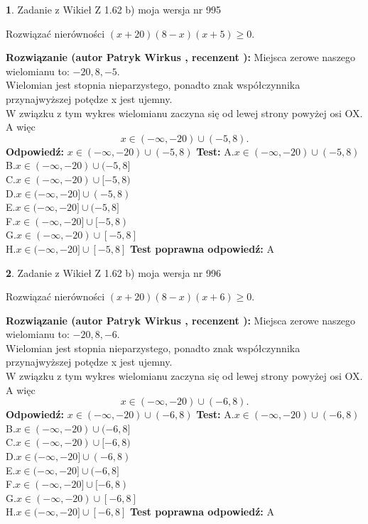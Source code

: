 \documentclass[12pt, a4paper]{article}
\theoremstyle{definition} %
\newtheorem{zad}{}
\newcommand{\zadStart}[1]{\begin{zad}#1\newline}
\newcommand{\zadStop}{\end{zad}}
\newcommand{\rozwStart}[2]{\noindent \textbf{Rozwiązanie (autor #1 , recenzent #2): }\newline}
\newcommand{\rozwStop}{\newline}
\newcommand{\odpStart}{\noindent \textbf{Odpowiedź:}\newline}
\newcommand{\odpStop}{\newline}
\newcommand{\testStart}{\noindent \textbf{Test:}\newline}
\newcommand{\testStop}{\newline}
\newcommand{\kluczStart}{\noindent \textbf{Test poprawna odpowiedź:}\newline}
\newcommand{\kluczStop}{\newline}
\begin{document}
\zadStart{Zadanie z Wikieł Z 1.62 b) moja wersja nr 995}

Rozwiązać nierówności $(x+20)(8-x)(x+5)\ge0$.
\zadStop
\rozwStart{Patryk Wirkus}{}
Miejsca zerowe naszego wielomianu to: $-20, 8, -5$.\\
Wielomian jest stopnia nieparzystego, ponadto znak współczynnika przy\linebreak najwyższej potędze x jest ujemny.\\ W związku z tym wykres wielomianu zaczyna się od lewej strony powyżej osi OX. A więc $$x \in (-\infty,-20) \cup (-5,8).$$
\rozwStop
\odpStart
$x \in (-\infty,-20) \cup (-5,8)$
\odpStop
\testStart
A.$x \in (-\infty,-20) \cup (-5,8)$\\
B.$x \in (-\infty,-20) \cup (-5,8]$\\
C.$x \in (-\infty,-20) \cup [-5,8)$\\
D.$x \in (-\infty,-20] \cup (-5,8)$\\
E.$x \in (-\infty,-20] \cup (-5,8]$\\
F.$x \in (-\infty,-20] \cup [-5,8)$\\
G.$x \in (-\infty,-20) \cup [-5,8]$\\
H.$x \in (-\infty,-20] \cup [-5,8]$
\testStop
\kluczStart
A
\kluczStop



\zadStart{Zadanie z Wikieł Z 1.62 b) moja wersja nr 996}

Rozwiązać nierówności $(x+20)(8-x)(x+6)\ge0$.
\zadStop
\rozwStart{Patryk Wirkus}{}
Miejsca zerowe naszego wielomianu to: $-20, 8, -6$.\\
Wielomian jest stopnia nieparzystego, ponadto znak współczynnika przy\linebreak najwyższej potędze x jest ujemny.\\ W związku z tym wykres wielomianu zaczyna się od lewej strony powyżej osi OX. A więc $$x \in (-\infty,-20) \cup (-6,8).$$
\rozwStop
\odpStart
$x \in (-\infty,-20) \cup (-6,8)$
\odpStop
\testStart
A.$x \in (-\infty,-20) \cup (-6,8)$\\
B.$x \in (-\infty,-20) \cup (-6,8]$\\
C.$x \in (-\infty,-20) \cup [-6,8)$\\
D.$x \in (-\infty,-20] \cup (-6,8)$\\
E.$x \in (-\infty,-20] \cup (-6,8]$\\
F.$x \in (-\infty,-20] \cup [-6,8)$\\
G.$x \in (-\infty,-20) \cup [-6,8]$\\
H.$x \in (-\infty,-20] \cup [-6,8]$
\testStop
\kluczStart
A
\kluczStop
\end{document}
